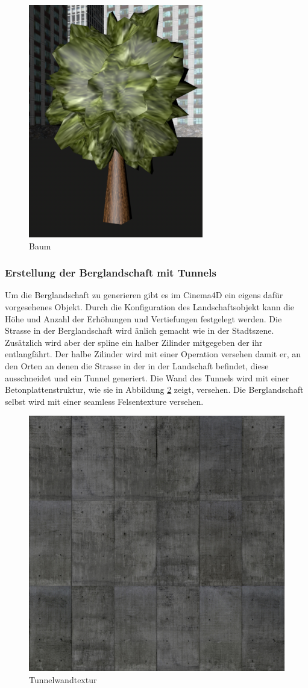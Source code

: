 \begin{figure}[H]
\centering 
\includegraphics[scale=0.4]{src/screenshot_tree.png}
\caption{Baum} %
\label{screenshot_tree} %
\end{figure}

\subsubsection{Erstellung der Berglandschaft mit Tunnels}
Um die Berglandschaft zu generieren gibt es im Cinema4D ein eigens dafür vorgesehenes Objekt. Durch die Konfiguration des Landschaftsobjekt kann die Höhe und Anzahl der Erhöhungen und Vertiefungen festgelegt werden. Die Strasse in der Berglandschaft wird änlich gemacht wie in der Stadtszene. Zusätzlich wird aber der \gls{spline} ein halber Zilinder mitgegeben der ihr entlangfährt. Der halbe Zilinder wird mit einer Operation versehen damit er, an den Orten an denen die Strasse in der in der Landschaft befindet, diese ausschneidet und ein Tunnel generiert. Die Wand des Tunnels wird mit einer Betonplattenstruktur, wie sie in Abbildung \ref{texture_concretetiles} zeigt, versehen. Die Berglandschaft selbst wird mit einer \gls{seamless} Felsentexture versehen. 
\begin{figure}[htbp]
\centering 
\includegraphics[width=0.4\linewidth]{src/texture_concretetiles.png}
\caption{Tunnelwandtextur} %
\label{texture_concretetiles} %
\end{figure}

